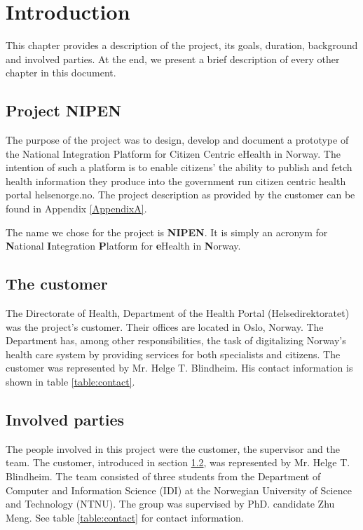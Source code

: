 
\chapter{Introduction} 
\label{Introduction} 


This chapter provides a description of the project, its goals, duration, background and involved parties.
At the end, we present a brief description of every other chapter in this document.

\section{Project NIPEN}
\label{section:description}

The purpose of the project was to design, develop and document a prototype of the National Integration Platform
for Citizen Centric eHealth in Norway.
The intention of such a platform is to enable citizens’ the ability to publish and fetch health information they produce
into the government run citizen centric health portal helsenorge.no.
The project description as provided by the customer can be found in Appendix \ref{AppendixA}.

The name we chose for the project is \textbf{NIPEN}.\newline
It is simply an acronym for \textbf{N}ational \textbf{I}ntegration \textbf{P}latform for \textbf{e}Health
in \textbf{N}orway.

\section{The customer}
\label{section:customer}

The Directorate of Health, Department of the Health Portal (Helsedirektoratet) was the project's customer.
Their offices are located in Oslo, Norway. 
The Department has, among other responsibilities, the task of digitalizing Norway's health care system by providing
services for both specialists and citizens. The customer was represented by Mr. Helge T. Blindheim.
His contact information is shown in table \ref{table:contact}.

\section{Involved parties}
\label{section:parties}

The people involved in this project were the customer, the supervisor and the team.
The customer, introduced in section \ref{section:customer}, was represented by Mr. Helge T. Blindheim.
The team consisted of three students from the Department of Computer and Information Science (IDI) at the Norwegian University of Science and Technology (NTNU). The group was supervised by PhD. candidate Zhu Meng.
See table \ref{table:contact} for contact information.

